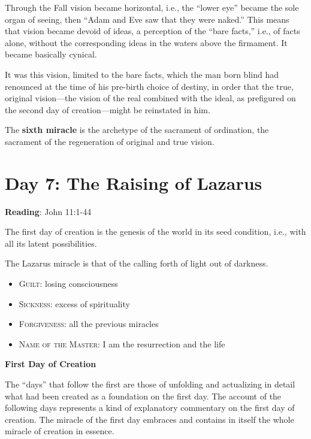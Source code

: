Through the Fall vision became horizontal, i.e., the ``lower eye'' became the sole organ of seeing, then ``Adam and Eve saw that they were naked.'' This means that vision became devoid of ideas, a perception of the ``bare facts,'' i.e., of facts alone, without the corresponding ideas in the waters above the firmament. It became basically cynical.

It was this vision, limited to the bare facts, which the man born blind had renounced at the time of his pre-birth choice of destiny, in order that the true, original vision—the vision of the real combined with the ideal, as prefigured on the second day of creation—might be reinstated in him.

\begin{quotex}
The \textbf{sixth miracle} is the archetype of the sacrament of ordination, the sacrament of the regeneration of original and true vision.

\end{quotex}

\section{Day 7: The Raising of Lazarus}

\textbf{Reading}: John 11:1-44

The first day of creation is the genesis of the world in its seed condition, i.e., with all its latent possibilities.

The Lazarus miracle is that of the calling forth of light out of darkness.

\begin{itemize}
\item \textsc{Guilt}: losing consciousness 
\item \textsc{Sickness}: excess of spirituality 
\item \textsc{Forgiveness}: all the previous miracles 
\item \textsc{Name of the Master}: I am the resurrection and the life 
\end{itemize}
\textbf{First Day of Creation}

The ``days'' that follow the first are those of unfolding and actualizing in detail what had been created as a foundation on the first day. The account of the following days represents a kind of explanatory commentary on the first day of creation. The miracle of the first day embraces and contains in itself the whole miracle of creation in essence.

